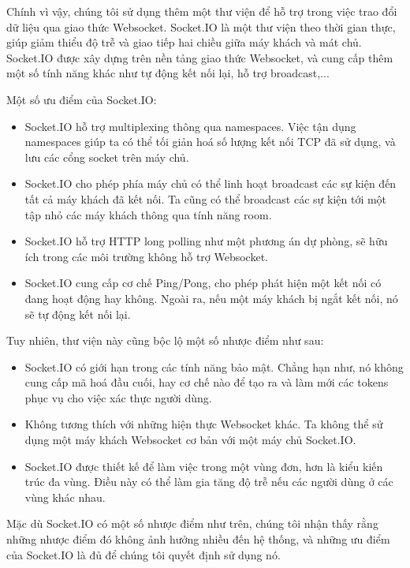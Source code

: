 \par
Chính vì vậy, chúng tôi sử dụng thêm một thư viện để hỗ trợ trong việc trao đổi
dữ liệu qua giao thức Websocket. Socket.IO là một thư viện theo thời gian thực,
giúp giảm thiểu độ trễ và giao tiếp hai chiều giữa máy khách và mát chủ.
Socket.IO được xây dựng trên nền tảng giao thức Websocket, và cung cấp thêm một
số tính năng khác như tự động kết nối lại, hỗ trợ broadcast,...
\par
Một số ưu điểm của Socket.IO:
\begin{itemize}
    \item Socket.IO hỗ trợ multiplexing thông qua namespaces. Việc tận dụng namespaces
          giúp ta có thể tối giản hoá số lượng kết nối TCP đã sử dụng, và lưu các cổng
          socket trên máy chủ.
    \item Socket.IO cho phép phía máy chủ có thể linh hoạt broadcast các sự kiện đến tất
          cả máy khách đã kết nối. Ta cũng có thể broadcast các sự kiện tới một tập nhỏ
          các máy khách thông qua tính năng room.
    \item Socket.IO hỗ trợ HTTP long polling như một phương án dự phòng, sẽ hữu ích trong
          các môi trường không hỗ trợ Websocket.
    \item Socket.IO cung cấp cơ chế Ping/Pong, cho phép phát hiện một kết nối có đang
          hoạt động hay không. Ngoài ra, nếu một máy khách bị ngắt kết nối, nó sẽ tự động
          kết nối lại.
\end{itemize}
Tuy nhiên, thư viện này cũng bộc lộ một số nhược điểm như sau:
\begin{itemize}
    \item Socket.IO có giới hạn trong các tính năng bảo mật. Chẳng hạn như, nó không cung
          cấp mã hoá đầu cuối, hay cơ chế nào để tạo ra và làm mới các tokens phục vụ cho
          việc xác thực người dùng.
    \item Không tương thích với những hiện thực Websocket khác. Ta không thể sử dụng một
          máy khách Websocket cơ bản với một máy chủ Socket.IO.
    \item Socket.IO được thiết kế để làm việc trong một vùng đơn, hơn là kiểu kiến trúc
          đa vùng. Điều này có thể làm gia tăng độ trễ nếu các người dùng ở các vùng khác
          nhau.
\end{itemize}
\par
Mặc dù Socket.IO có một số nhược điểm như trên, chúng tôi nhận thấy rằng những
nhược điểm đó không ảnh hưởng nhiều đến hệ thống, và những ưu điểm của
Socket.IO là đủ để chúng tôi quyết định sử dụng nó.

